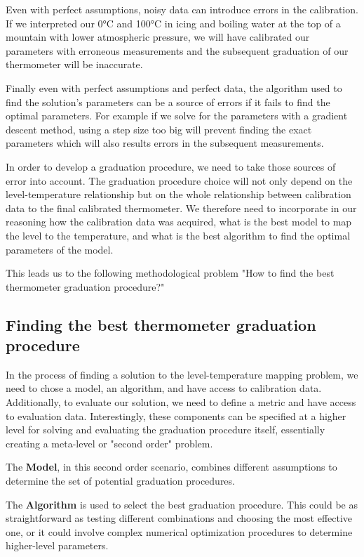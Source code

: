 \begin{bibunit}
 Even with perfect assumptions, noisy data can introduce errors in the calibration. If we interpreted our 0°C and 100°C in icing and boiling water at the top of a mountain with lower atmospheric pressure, we will have calibrated our parameters with erroneous measurements and the subsequent graduation of our thermometer will be inaccurate.

 Finally even with perfect assumptions and perfect data, the algorithm used to find the solution's parameters can be a source of errors if it fails to find the optimal parameters. For example if we solve for the parameters with a gradient descent method, using a step size too big will prevent finding the exact parameters which will also results errors in the subsequent measurements.

In order to develop a graduation procedure, we need to take those sources of error into account. The graduation procedure choice will not only depend on the level-temperature relationship but on the whole relationship between calibration data to the final calibrated thermometer. We therefore need to incorporate in our reasoning how the calibration data was acquired, what is the best model to map the level to the temperature, and what is the best algorithm to find the optimal parameters of the model.


This leads us to the following methodological problem "How to find the best thermometer graduation procedure?"

\subsection{Finding the best thermometer graduation procedure}
In the process of finding a solution to the level-temperature mapping problem, we need to chose a model, an algorithm, and have access to calibration data. Additionally, to evaluate our solution, we need to define a metric and have access to evaluation data. Interestingly, these components can be specified at a higher level for solving and evaluating the graduation procedure itself, essentially creating a meta-level or "second order" problem.

The \textbf{Model}, in this second order scenario, combines different assumptions to determine the set of potential graduation procedures. 

The \textbf{Algorithm} is used to select the best graduation procedure. This could be as straightforward as testing different combinations and choosing the most effective one, or it could involve complex numerical optimization procedures to determine higher-level parameters.


\end{bibunit}
